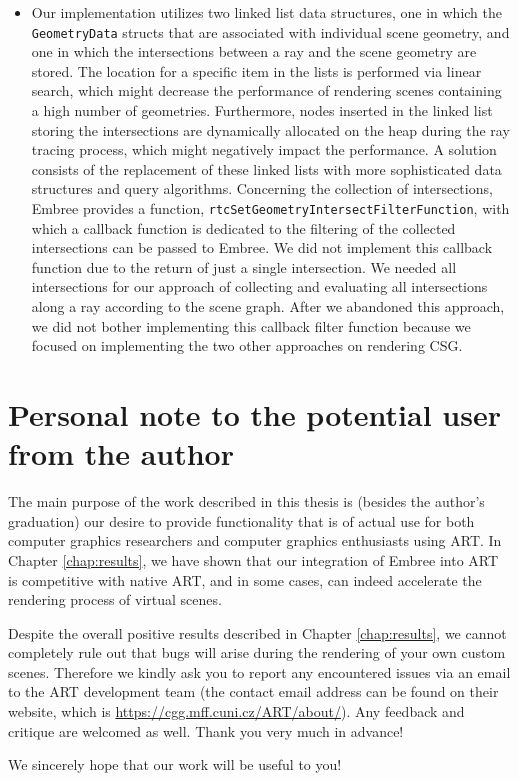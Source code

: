 \begin{itemize}
	\item[] Our implementation utilizes two linked list data structures, one in which the \texttt{GeometryData} structs that are associated with individual scene geometry, and one in which the intersections between a ray and the scene geometry are stored. The location for a specific item in the lists is performed via linear search, which might decrease the performance of rendering scenes containing a high number of geometries. Furthermore, nodes inserted in the linked list storing the intersections are dynamically allocated on the heap during the ray tracing process, which might negatively impact the performance. A solution consists of the replacement of these linked lists with more sophisticated data structures and query algorithms. Concerning the collection of intersections, Embree provides a function, \texttt{rtcSetGeometryIntersectFilterFunction}, with which a callback function is dedicated to the filtering of the collected intersections can be passed to Embree. We did not implement this callback function due to the return of just a single intersection. We needed all intersections for our approach of collecting and evaluating all intersections along a ray according to the scene graph. After we abandoned this approach, we did not bother implementing this callback filter function because we focused on implementing the two other approaches on rendering CSG.
	
\end{itemize}


\section*{Personal note to the potential user from the author}

The main purpose of the work described in this thesis is (besides the author's graduation) our desire to provide functionality that is of actual use for both computer graphics researchers and computer graphics enthusiasts using ART. In Chapter \ref{chap:results}, we have shown that our integration of Embree into ART is competitive with native ART, and in some cases, can indeed accelerate the rendering process of virtual scenes.

Despite the overall positive results described in Chapter \ref{chap:results}, we cannot completely rule out that bugs will arise during the rendering of your own custom scenes. Therefore we kindly ask you to report any encountered issues via an email to the ART development team (the contact email address can be found on their website, which is \href{https://cgg.mff.cuni.cz/ART/about/}{https://cgg.mff.cuni.cz/ART/about/}). Any feedback and critique are welcomed as well. Thank you very much in advance!

We sincerely hope that our work will be useful to you!